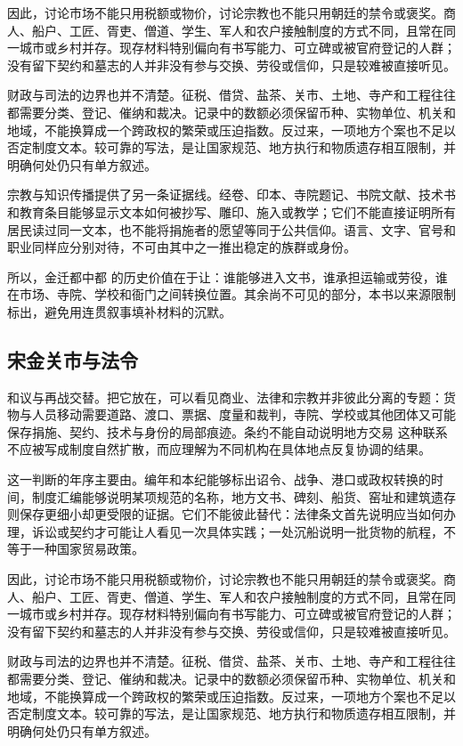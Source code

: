 因此，讨论市场不能只用税额或物价，讨论宗教也不能只用朝廷的禁令或褒奖。商人、船户、工匠、胥吏、僧道、学生、军人和农户接触制度的方式不同，且常在同一城市或乡村并存。现存材料特别偏向有书写能力、可立碑或被官府登记的人群；没有留下契约和墓志的人并非没有参与交换、劳役或信仰，只是较难被直接听见。

财政与司法的边界也并不清楚。征税、借贷、盐茶、关市、土地、寺产和工程往往都需要分类、登记、催纳和裁决。记录中的数额必须保留币种、实物单位、机关和地域，不能换算成一个跨政权的繁荣或压迫指数。反过来，一项地方个案也不足以否定制度文本。较可靠的写法，是让国家规范、地方执行和物质遗存相互限制，并明确何处仍只有单方叙述。

宗教与知识传播提供了另一条证据线。经卷、印本、寺院题记、书院文献、技术书和教育条目能够显示文本如何被抄写、雕印、施入或教学；它们不能直接证明所有居民读过同一文本，也不能将捐施者的愿望等同于公共信仰。语言、文字、官号和职业同样应分别对待，不可由其中之一推出稳定的族群或身份。

所以，金迁都中都 的历史价值在于让：谁能够进入文书，谁承担运输或劳役，谁在市场、寺院、学校和衙门之间转换位置。其余尚不可见的部分，本书以来源限制标出，避免用连贯叙事填补材料的沉默。

\subsection{宋金关市与法令}

和议与再战交替。把它放在，可以看见商业、法律和宗教并非彼此分离的专题：货物与人员移动需要道路、渡口、票据、度量和裁判，寺院、学校或其他团体又可能保存捐施、契约、技术与身份的局部痕迹。条约不能自动说明地方交易 这种联系不应被写成制度自然扩散，而应理解为不同机构在具体地点反复协调的结果。

这一判断的年序主要由。编年和本纪能够标出诏令、战争、港口或政权转换的时间，制度汇编能够说明某项规范的名称，地方文书、碑刻、船货、窑址和建筑遗存则保存更细小却更受限的证据。它们不能彼此替代：法律条文首先说明应当如何办理，诉讼或契约才可能让人看见一次具体实践；一处沉船说明一批货物的航程，不等于一种国家贸易政策。

因此，讨论市场不能只用税额或物价，讨论宗教也不能只用朝廷的禁令或褒奖。商人、船户、工匠、胥吏、僧道、学生、军人和农户接触制度的方式不同，且常在同一城市或乡村并存。现存材料特别偏向有书写能力、可立碑或被官府登记的人群；没有留下契约和墓志的人并非没有参与交换、劳役或信仰，只是较难被直接听见。

财政与司法的边界也并不清楚。征税、借贷、盐茶、关市、土地、寺产和工程往往都需要分类、登记、催纳和裁决。记录中的数额必须保留币种、实物单位、机关和地域，不能换算成一个跨政权的繁荣或压迫指数。反过来，一项地方个案也不足以否定制度文本。较可靠的写法，是让国家规范、地方执行和物质遗存相互限制，并明确何处仍只有单方叙述。

